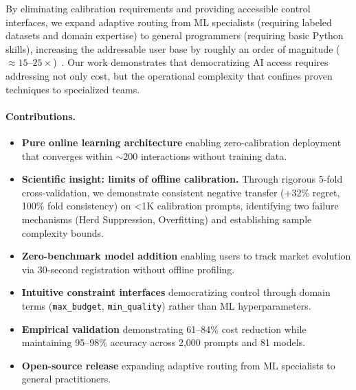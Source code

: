 By eliminating calibration requirements and providing accessible control interfaces, we expand adaptive routing from ML specialists (requiring labeled datasets and domain expertise) to general programmers (requiring basic Python skills), increasing the addressable user base by roughly an order of magnitude ($\approx 15$--$25\times$)~\cite{stackoverflow2024survey,github2025developer}. Our work demonstrates that democratizing AI access requires addressing not only cost, but the operational complexity that confines proven techniques to specialized teams.

\paragraph{Contributions.}
\begin{itemize}[leftmargin=*,nosep]
    \item \textbf{Pure online learning architecture} enabling zero-calibration deployment that converges within $\sim$200 interactions without training data.
    \item \textbf{Scientific insight: limits of offline calibration.} Through rigorous 5-fold cross-validation, we demonstrate consistent negative transfer (+32\% regret, 100\% fold consistency) on <1K calibration prompts, identifying two failure mechanisms (Herd Suppression, Overfitting) and establishing sample complexity bounds.
    \item \textbf{Zero-benchmark model addition} enabling users to track market evolution via 30-second registration without offline profiling.
    \item \textbf{Intuitive constraint interfaces} democratizing control through domain terms (\texttt{max\_budget}, \texttt{min\_quality}) rather than ML hyperparameters.
    \item \textbf{Empirical validation} demonstrating 61--84\% cost reduction while maintaining 95--98\% accuracy across 2,000 prompts and 81 models.
    \item \textbf{Open-source release} expanding adaptive routing from ML specialists to general practitioners.
\end{itemize}


